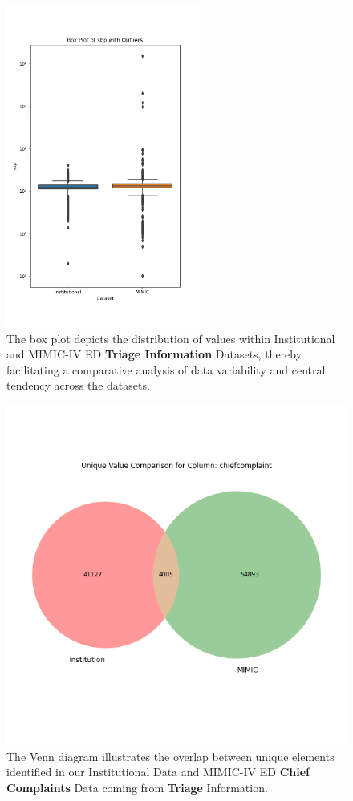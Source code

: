 \documentclass[pmlr]{jmlr}%
\begin{document}
\begin{figure}[h!]
   \includegraphics[width=2.5in]{plots/sbp_triage_boxplot.png} 
   \caption{The box plot depicts the distribution of values within Institutional and MIMIC-IV ED \textbf{Triage Information} Datasets, thereby facilitating a comparative analysis of data variability and central tendency across the datasets.}
   \label{app4} 
 \end{figure} 

 \begin{figure}[h!]
   \centering 
   \includegraphics[width=5in]{plots/chiefcomplaint_venn.png} 
   \caption{The Venn diagram illustrates the overlap between unique elements identified in our Institutional Data and MIMIC-IV ED \textbf{Chief Complaints} Data coming from \textbf{Triage} Information.}
   \label{app5} 
 \end{figure} 
\end{document}
